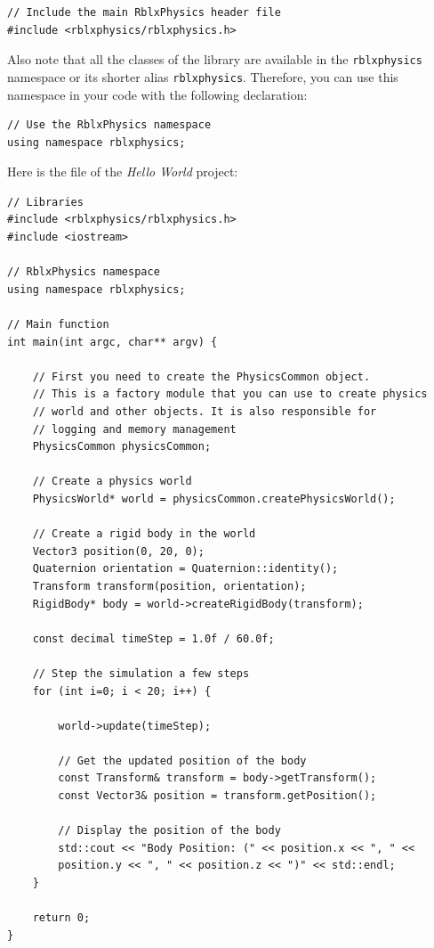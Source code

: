 \documentclass[a4paper,12pt]{article}
\begin{document}
    \begin{lstlisting}
// Include the main RblxPhysics header file
#include <rblxphysics/rblxphysics.h>
  \end{lstlisting}

    \vspace{0.6cm}

    Also note that all the classes of the library are available in the \texttt{rblxphysics} namespace or its shorter alias
    \texttt{rblxphysics}. Therefore, you can use this namespace in your code with the following declaration: \\

    \begin{lstlisting}
// Use the RblxPhysics namespace
using namespace rblxphysics;
    \end{lstlisting}

    \vspace{0.6cm}

    Here is the  file of the \emph{Hello World} project: \\

    \begin{lstlisting}
// Libraries
#include <rblxphysics/rblxphysics.h>
#include <iostream>

// RblxPhysics namespace
using namespace rblxphysics;

// Main function
int main(int argc, char** argv) {

    // First you need to create the PhysicsCommon object.
    // This is a factory module that you can use to create physics
    // world and other objects. It is also responsible for
    // logging and memory management
    PhysicsCommon physicsCommon;

    // Create a physics world
    PhysicsWorld* world = physicsCommon.createPhysicsWorld();

    // Create a rigid body in the world
    Vector3 position(0, 20, 0);
    Quaternion orientation = Quaternion::identity();
    Transform transform(position, orientation);
    RigidBody* body = world->createRigidBody(transform);

    const decimal timeStep = 1.0f / 60.0f;

    // Step the simulation a few steps
    for (int i=0; i < 20; i++) {

        world->update(timeStep);

        // Get the updated position of the body
        const Transform& transform = body->getTransform();
        const Vector3& position = transform.getPosition();

        // Display the position of the body
        std::cout << "Body Position: (" << position.x << ", " <<
	    position.y << ", " << position.z << ")" << std::endl;
    }

    return 0;
}
    \end{lstlisting}
   
\end{document}

